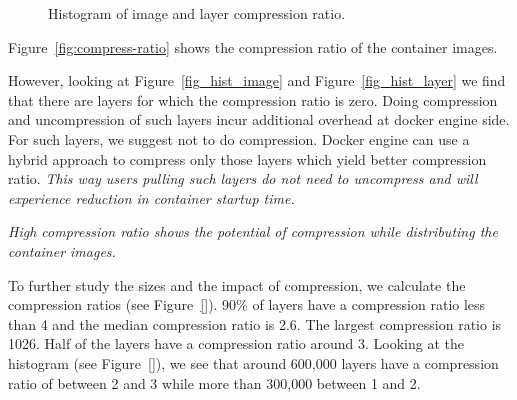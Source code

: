 \begin{figure}[!t]
	\centering
	\caption{Histogram of image and layer compression ratio.}
	\label{fig:reference-cnt}
\end{figure}

Figure~\ref{fig:compress-ratio} shows the compression ratio of the container
images.    %

However, looking at Figure~\ref{fig_hist_image} and Figure~\ref{fig_hist_layer}
we find that there are layers for which the compression ratio is zero. Doing
compression and uncompression of such layers incur additional overhead at
docker engine side.  For such layers, we suggest not to do compression.
Docker engine can use a hybrid approach to compress
only those layers which yield better compression ratio. 
\emph{This way users pulling such layers do not need to uncompress
	and will experience reduction in container startup time.}

\emph{High compression
	ratio shows the potential of compression while distributing the container
	images.}


To further study the sizes and the impact of compression, we calculate the
compression ratios (see Figure~\ref{}).
%
%
90\% of layers have a  compression ratio less than 4 and the median compression
ratio is 2.6. The largest compression ratio is 1026.
%
Half of the layers have a compression ratio around 3.
%
%
%
Looking at the histogram (see Figure~\ref{}), we see
that around 600,000 layers have a compression ratio of between 2 and 3 while
more than 300,000 between 1 and 2.
%

